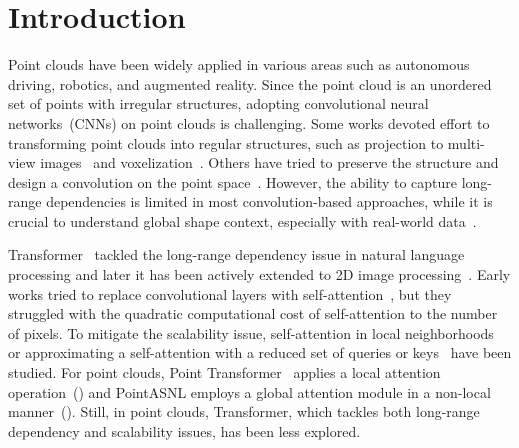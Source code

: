 \documentclass[10pt,twocolumn,letterpaper]{article}
\begin{document}
\section{Introduction}
    \label{sec:1}
Point clouds have been widely applied in various areas such as autonomous driving, robotics, and augmented reality.  
Since the point cloud is an unordered set of points with irregular structures, adopting convolutional neural networks~(CNNs) on point clouds is challenging.
Some works devoted effort to transforming point clouds into regular structures, such as projection to multi-view images~\cite{su2015multi,chen2017multi} and voxelization~\cite{maturana2015voxnet,zhou2018voxelnet}.
Others have tried to preserve the structure and design a convolution on the point space~\cite{liu2019relation,thomas2019kpconv,li2018pointcnn,atzmon2018point,xu2018spidercnn,wu2019pointconv,xu2021paconv}.
However, the ability to capture long-range dependencies is limited in most convolution-based approaches, while it is crucial to understand global shape context, especially with real-world data~\cite{uy2019revisiting}.

Transformer~\cite{vaswani2017attention} tackled the long-range dependency issue in natural language processing and later it has been actively extended to 2D image processing~\cite{dosovitskiy2020image,liu2021swin,chu2021Twins,wang2021pyramid}.
Early works tried to replace convolutional layers with self-attention~\cite{dosovitskiy2020image,ramachandran2019stand,hu2019local,parmar2018image,chen2020generative,cordonnier2019relationship}, but they struggled with the quadratic computational cost of self-attention to the number of pixels.
To mitigate the scalability issue, self-attention in local neighborhoods~\cite{liu2021swin,wang2021pyramid} or approximating a self-attention with a reduced set of queries or keys~\cite{chu2021Twins,jaegle2021perceiver,zhu2020deformable} have been studied.
For point clouds, Point Transformer~\cite{zhao2021point} applies a local attention operation~() and PointASNL \cite{yan2020pointasnl} employs a global attention module in a non-local manner~().
Still, in point clouds, Transformer, which tackles both long-range dependency and scalability issues, has been less explored.
\end{document}
